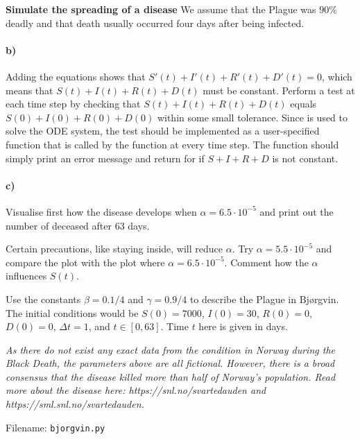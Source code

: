 \begin{Problem}{\textbf{Simulate the spreading of a disease}}
We assume that the Plague was $90 \%$ deadly and that death usually occurred four days after being infected.

\paragraph{b)}
Adding the equations shows that $S'(t) + I'(t) + R'(t) + D'(t) = 0$, which means that $S(t) + I(t) + R(t) + D(t)$ must be constant. Perform a test at each time step by checking that $S(t) + I(t) + R(t) + D(t)$ equals $S(0)+I(0)+R(0)+D(0)$ within some small tolerance. Since  is used to solve the ODE system, the test should be implemented as a user-specified  function that is called by the  function at every time step. The  function should simply print an error message and return  for if $S+I+R+D$ is not constant.

\paragraph{c)}
Visualise first how the disease develops when $\alpha = 6.5 \cdot 10 ^{-5}$ and  print out the number of deceased after 63 days. 

Certain precautions, like staying inside, will reduce $\alpha$. Try $\alpha = 5.5 \cdot 10 ^{-5}$ and  compare the plot with the plot where $\alpha = 6.5 \cdot 10 ^{-5}$. Comment how the  $\alpha$ influences $S(t)$. 

Use the constants $\beta = 0.1/4$ and $\gamma = 0.9/4$ to describe the Plague in Bjørgvin. The initial conditions would be $S(0) = 7000$, $I(0) = 30$, $R(0) = 0$, $D(0) = 0$, $\Delta t = 1$, and $t \in [0,63]$. Time $t$ here is given in days. 

\emph{As there do not exist any exact data from the condition in Norway during the Black Death, the parameters above are all fictional. However, there is a broad consensus that the disease killed more than half of Norway's population. Read more about the disease here: https://snl.no/svartedauden and https://sml.snl.no/svartedauden.}

Filename: \texttt{bjorgvin.py}
\end{Problem}


